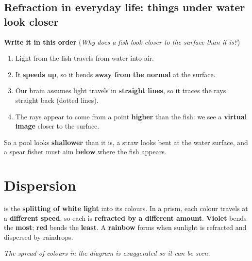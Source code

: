 \documentclass[11pt]{article}
\begin{document}
\subsection*{Refraction in everyday life: things under water look closer}
\begin{minipage}[t]{0.5\textwidth}
\vspace{0pt}
\textbf{Write it in this order} (\emph{Why does a fish look closer to the surface than it is?})
\begin{enumerate}
\item Light from the fish travels from water into air.
\item It \textbf{speeds up}, so it bends \textbf{away from the normal} at the surface.
\item Our brain assumes light travels in \textbf{straight lines}, so it traces the rays straight back (dotted lines).
\item The rays appear to come from a point \textbf{higher} than the fish: we see a \textbf{virtual image} closer to the surface.
\end{enumerate}
So a pool looks \textbf{shallower} than it is, a straw looks bent at the water surface, and a spear fisher must aim \textbf{below} where the fish appears.
\end{minipage}\hfill
\begin{minipage}[t]{0.46\textwidth}
\vspace{0pt}\centering
\FigFish[7mm]
\end{minipage}

\section{Dispersion}\label{sec:dispersion}
\begin{minipage}[t]{0.52\textwidth}
\vspace{0pt}
\textbf{\tDispersion} is the \textbf{splitting of white light} into its colours.
In a prism, each colour travels at a \textbf{different speed}, so each is \textbf{refracted by a different amount}.
\textbf{Violet} bends the \textbf{most}; \textbf{red} bends the \textbf{least}.
A \textbf{rainbow} forms when sunlight is refracted and dispersed by raindrops.

\emph{The spread of colours in the diagram is exaggerated so it can be seen.}
\end{minipage}\hfill
\begin{minipage}[t]{0.45\textwidth}
\vspace{0pt}\centering
\FigPrism[5.4mm]
\end{minipage}
\end{document}
